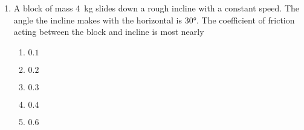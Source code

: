 \documentclass{../../../oss-apphys}
\begin{document}
\begin{multicols}{2}
\begin{enumerate}[resume,leftmargin=18pt]
    
  \item A block of mass \SI{4}{\kilo\gram} slides down a rough incline with a
    constant speed. The angle the incline makes with the horizontal is
    \ang{30}. The coefficient of friction acting between the block and incline
    is most nearly
    \begin{center}
    \end{center}
    \begin{enumerate}[noitemsep,topsep=0pt,leftmargin=18pt,label=(\Alph*)]
    \item $0.1$
    \item $0.2$
    \item $0.3$
    \item $0.4$
    \item $0.6$
    \end{enumerate}
    \columnbreak
    

\end{enumerate}
\end{multicols}
\end{document}
